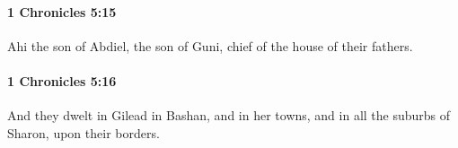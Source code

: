 		\paragraph{1 Chronicles 5:15} %
			\label{1CHRONICLES-5-15}

			Ahi the son of Abdiel, the son of Guni, chief of the house of their fathers.


		\paragraph{1 Chronicles 5:16} %
			\label{1CHRONICLES-5-16}

			And they dwelt in Gilead in Bashan, and in her towns, and in all the suburbs of Sharon, upon their borders.


